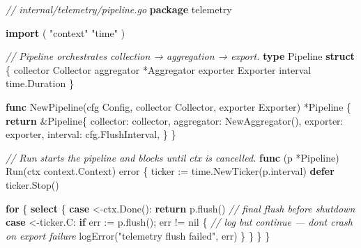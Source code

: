 \documentclass[
]{article}
\newenvironment{Shaded}{}{}
\newcommand{\CommentTok}[1]{\textcolor[rgb]{0.38,0.63,0.69}{\textit{#1}}}
\newcommand{\ControlFlowTok}[1]{\textcolor[rgb]{0.00,0.44,0.13}{\textbf{#1}}}
\newcommand{\DataTypeTok}[1]{\textcolor[rgb]{0.56,0.13,0.00}{#1}}
\newcommand{\KeywordTok}[1]{\textcolor[rgb]{0.00,0.44,0.13}{\textbf{#1}}}
\newcommand{\NormalTok}[1]{#1}
\newcommand{\OperatorTok}[1]{\textcolor[rgb]{0.40,0.40,0.40}{#1}}
\newcommand{\OtherTok}[1]{\textcolor[rgb]{0.00,0.44,0.13}{#1}}
\newcommand{\StringTok}[1]{\textcolor[rgb]{0.25,0.44,0.63}{#1}}
\begin{document}
\begin{Shaded}
\begin{Highlighting}[]
\CommentTok{// internal/telemetry/pipeline.go}
\KeywordTok{package}\NormalTok{ telemetry}

\KeywordTok{import} \OperatorTok{(}
    \StringTok{"context"}
    \StringTok{"time"}
\OperatorTok{)}

\CommentTok{// Pipeline orchestrates collection → aggregation → export.}
\KeywordTok{type}\NormalTok{ Pipeline }\KeywordTok{struct} \OperatorTok{\{}
\NormalTok{    collector  Collector}
\NormalTok{    aggregator }\OperatorTok{*}\NormalTok{Aggregator}
\NormalTok{    exporter   Exporter}
\NormalTok{    interval   time}\OperatorTok{.}\NormalTok{Duration}
\OperatorTok{\}}

\KeywordTok{func}\NormalTok{ NewPipeline}\OperatorTok{(}\NormalTok{cfg Config}\OperatorTok{,}\NormalTok{ collector Collector}\OperatorTok{,}\NormalTok{ exporter Exporter}\OperatorTok{)} \OperatorTok{*}\NormalTok{Pipeline }\OperatorTok{\{}
    \ControlFlowTok{return} \OperatorTok{\&}\NormalTok{Pipeline}\OperatorTok{\{}
\NormalTok{        collector}\OperatorTok{:}\NormalTok{  collector}\OperatorTok{,}
\NormalTok{        aggregator}\OperatorTok{:}\NormalTok{ NewAggregator}\OperatorTok{(),}
\NormalTok{        exporter}\OperatorTok{:}\NormalTok{   exporter}\OperatorTok{,}
\NormalTok{        interval}\OperatorTok{:}\NormalTok{   cfg}\OperatorTok{.}\NormalTok{FlushInterval}\OperatorTok{,}
    \OperatorTok{\}}
\OperatorTok{\}}

\CommentTok{// Run starts the pipeline and blocks until ctx is cancelled.}
\KeywordTok{func} \OperatorTok{(}\NormalTok{p }\OperatorTok{*}\NormalTok{Pipeline}\OperatorTok{)}\NormalTok{ Run}\OperatorTok{(}\NormalTok{ctx context}\OperatorTok{.}\NormalTok{Context}\OperatorTok{)} \DataTypeTok{error} \OperatorTok{\{}
\NormalTok{    ticker }\OperatorTok{:=}\NormalTok{ time}\OperatorTok{.}\NormalTok{NewTicker}\OperatorTok{(}\NormalTok{p}\OperatorTok{.}\NormalTok{interval}\OperatorTok{)}
    \ControlFlowTok{defer}\NormalTok{ ticker}\OperatorTok{.}\NormalTok{Stop}\OperatorTok{()}

    \ControlFlowTok{for} \OperatorTok{\{}
        \ControlFlowTok{select} \OperatorTok{\{}
        \ControlFlowTok{case} \OperatorTok{\textless{}{-}}\NormalTok{ctx}\OperatorTok{.}\NormalTok{Done}\OperatorTok{():}
            \ControlFlowTok{return}\NormalTok{ p}\OperatorTok{.}\NormalTok{flush}\OperatorTok{()} \CommentTok{// final flush before shutdown}
        \ControlFlowTok{case} \OperatorTok{\textless{}{-}}\NormalTok{ticker}\OperatorTok{.}\NormalTok{C}\OperatorTok{:}
            \ControlFlowTok{if}\NormalTok{ err }\OperatorTok{:=}\NormalTok{ p}\OperatorTok{.}\NormalTok{flush}\OperatorTok{();}\NormalTok{ err }\OperatorTok{!=} \OtherTok{nil} \OperatorTok{\{}
                \CommentTok{// log but continue — don\textquotesingle{}t crash on export failure}
\NormalTok{                logError}\OperatorTok{(}\StringTok{"telemetry flush failed"}\OperatorTok{,}\NormalTok{ err}\OperatorTok{)}
            \OperatorTok{\}}
        \OperatorTok{\}}
    \OperatorTok{\}}
\OperatorTok{\}}


\end{Highlighting}
\end{Shaded}
\end{document}
